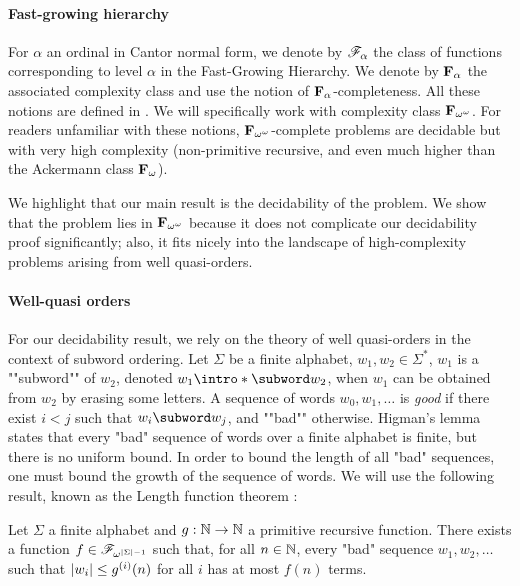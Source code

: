 \paragraph*{Fast-growing hierarchy}

For $\alpha$ an ordinal in Cantor normal form, we denote by $\mathscr{F}_{\alpha}$ the class of functions corresponding to level $\alpha$ in the Fast-Growing Hierarchy. We denote by $\mathbf{F}_{\alpha}$ the associated complexity class and use the notion of $\mathbf{F}_{\alpha}$-completeness. All these notions are defined in \cite{Schmitz16}. We will specifically work with complexity class $\mathbf{F}_{\omega^{\omega}}$. For readers unfamiliar with these notions, $\mathbf{F}_{\omega^{\omega}}$-complete problems are decidable but with very high complexity (non-primitive recursive, and even much higher than the Ackermann class $\mathbf{F}_{\omega}$). 

We highlight that our main result is the decidability of the problem. We show that the problem lies in $\mathbf{F}_{\omega^{\omega}}$ because it does not complicate our decidability proof significantly; also, it fits nicely into the landscape of high-complexity problems arising from well quasi-orders. 

\paragraph*{Well-quasi orders}

For our decidability result, we rely on the theory of well quasi-orders in the context of subword ordering.
Let $\Sigma$ be a finite alphabet, $w_1, w_2 \in \Sigma^*$, $w_1$ is a ""subword"" of $w_2$, denoted $w_1 \intro*\subword w_2$, when $w_1$ can be obtained from $w_2$ by erasing some letters. 
A sequence of words $w_0, w_1, \ldots$ is \emph{good} if there exist $i<j$ such that $w_i \subword w_j$, and ""bad"" otherwise. Higman's lemma \cite{Higman52} states that every "bad" sequence of words over a finite alphabet is finite, but there is no uniform bound.
In order to bound the length of all "bad" sequences, one must bound the growth of the sequence of words. 
We will use the following result, known as the Length function theorem \cite{SchmitzS2011upperHigman}:

\begin{theorem}
	\label{thm:lengthfcttheorem}
	Let $\Sigma$ a finite alphabet and $g : \mathbb{N} \to \mathbb{N}$ a primitive recursive function.
	There exists a function $f \in \mathscr{F}_{\omega^{|\Sigma| - 1}}$ such that, for all $n \in \mathbb{N}$, every "bad" sequence $w_1, w_2, \ldots$ such that $|w_i| \leq g^{(i)}(n)$ for all $i$ has at most $f(n)$ terms. 
\end{theorem}



